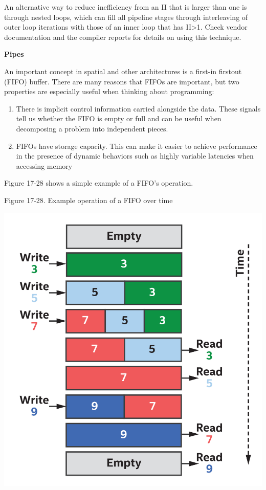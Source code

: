 An alternative way to reduce inefficiency from an II that is larger than one is through nested loops, which can fill all pipeline stages through interleaving of outer loop iterations with those of an inner loop that has II>1. Check vendor documentation and the compiler reports for details on using this technique.\par

\hspace*{\fill} \par %
\textbf{Pipes}

An important concept in spatial and other architectures is a first-in firstout (FIFO) buffer. There are many reasons that FIFOs are important, but two properties are especially useful when thinking about programming:\par

\begin{enumerate}
	\item There is implicit control information carried alongside the data. These signals tell us whether the FIFO is empty or full and can be useful when decomposing a problem into independent pieces.
	\item FIFOs have storage capacity. This can make it easier to achieve performance in the presence of dynamic behaviors such as highly variable latencies when accessing memory
\end{enumerate}

Figure 17-28 shows a simple example of a FIFO’s operation.\par

\hspace*{\fill} \par %
Figure 17-28. Example operation of a FIFO over time
\begin{center}
	\includegraphics[width=1.0\textwidth]{content/chapter-17/images/23}
\end{center}

